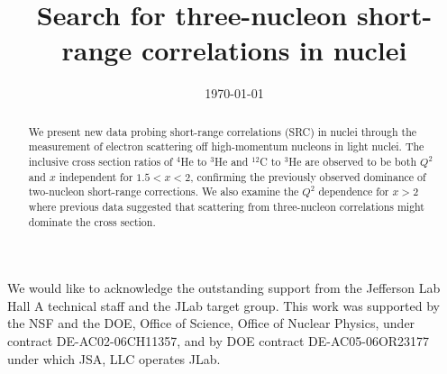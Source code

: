 \documentclass[
reprint, superscriptaddress,
	showpacs,
	amsmath,amssymb,
	aps,
	prl,
	floatfix,
	]{revtex4-1}
\begin{document}
	\title{Search for three-nucleon short-range correlations in nuclei}

		

		\date{\today}

		\begin{abstract}

We present new data probing short-range correlations (SRC) in nuclei through the measurement of electron scattering off high-momentum nucleons in
light nuclei. The inclusive cross section ratios of $^4$He to $^3$He and $^{12}$C to $^3$He are observed to be both $Q^2$ and $x$ independent
for $1.5 < x <2$, confirming the previously observed dominance of two-nucleon short-range corrections. We also examine the $Q^2$ dependence for
$x > 2$ where previous data suggested that scattering from three-nucleon correlations might dominate the cross section.



		\end{abstract}

		\maketitle

		

		
		

		

		\begin{acknowledgments}
We would like to acknowledge the outstanding support from the Jefferson Lab Hall A 
technical staff and the JLab target group. This work was supported by the NSF and the
DOE, Office of Science, Office of Nuclear Physics, under contract DE-AC02-06CH11357, and by DOE 
contract DE-AC05-06OR23177 under which JSA, LLC operates JLab.
		\end{acknowledgments}

		
		

		
\end{document}
